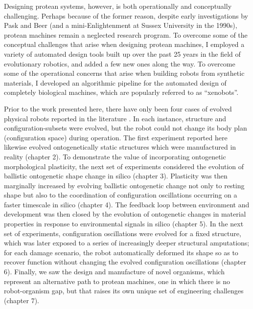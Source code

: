 Designing protean systems, however, is both operationally and conceptually challenging.
Perhaps because of the former reason, despite early investigations by Pask and Beer (and a mini-Enlightenment at Sussex University in the 1990s), protean machines remain a neglected research program.
To overcome some of the conceptual challenges that arise when designing protean machines,
I employed a variety of automated design tools built up over the past 25 years in the field of evolutionary robotics, and added a few new ones along the way.
To overcome some of the operational concerns that arise when building robots from synthetic materials,
I developed an algorithmic pipeline for the 
automated design of completely biological machines,
which are popularly referred to as ``xenobots''.


Prior to the work presented here,
there have only been four cases of evolved physical robots reported in the literature
\cite{lipson2000automatic,hiller2012automatic,brodbeck2015morphological,cellucci20171d}.
In each instance, structure and configuration-subsets were evolved, but the robot could not change its body plan (configuration space) during operation.
The first experiment reported here likewise evolved ontogenetically static structures which were manufactured in reality (chapter 2).
To demonstrate 
the value of incorporating ontogenetic morphological plasticity,
the next set of experiments considered
the evolution of ballistic ontogenetic shape change in silico (chapter 3).
Plasticity was then marginally increased by
evolving ballistic ontogenetic change not only to resting shape but also to the coordination of configuration oscillations occurring on a faster timescale in silico (chapter 4).
The feedback loop between environment and development was then closed by
the evolution of ontogenetic changes in material properties in response to environmental signals in silico (chapter 5).
In the next set of experiments,
configuration oscillations were evolved for a fixed structure,
which was later exposed to a series of 
increasingly deeper structural amputations;
for each damage scenario, the robot automatically deformed its shape so as to recover function without changing the evolved configuration oscillations (chapter 6).
Finally, we saw the design and manufacture of novel organisms, which represent an alternative path to protean machines, one in which there is no robot-organism gap, but that raises its own unique set of engineering challenges (chapter 7).

